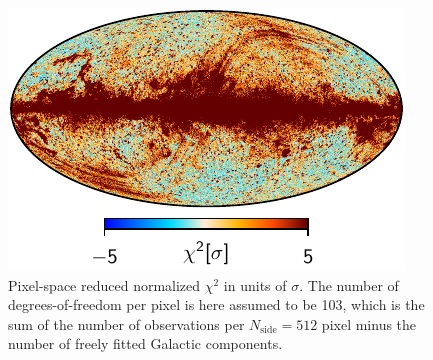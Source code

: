\documentclass{aa}
\begin{document}
       \begin{figure}
       	\centering
       	\includegraphics[width=\linewidth]{figs/chisq_CG02_c1.pdf}
       	\caption{Pixel-space reduced normalized $\chi^2$ in units of $\sigma$. The number of degrees-of-freedom per pixel is here assumed to be 103, which is the sum of the number of observations per $N_{\mathrm{side}}=512$ pixel minus the number of freely fitted Galactic components. }
       	\label{fig:chisq}
       \end{figure}
\end{document}
